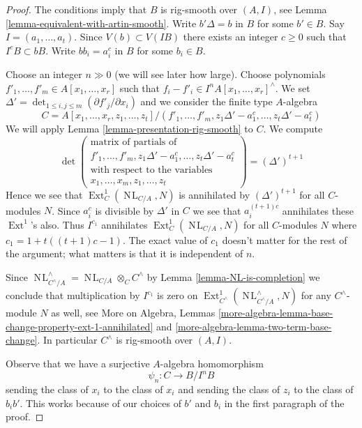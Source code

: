 \documentclass[10pt,a4paper]{amsart}
\theoremstyle{plain}
\theoremstyle{definition}
\theoremstyle{remark}
\numberwithin{equation}{subsection}
\def\Ext{\mathop{\mathrm{Ext}}\nolimits}
\def\NL{\mathop{N\!L}\nolimits}
\begin{document}
\begin{proof}
The conditions imply that $B$ is rig-smooth over $(A, I)$, see
Lemma \ref{lemma-equivalent-with-artin-smooth}.
Write $b' \Delta = b$ in $B$ for some $b' \in B$.
Say $I = (a_1, \ldots, a_t)$. Since $V(b) \subset V(IB)$ there
exists an integer $c \geq 0$ such that $I^cB \subset bB$.
Write $bb_i = a_i^c$ in $B$ for some $b_i \in B$.

\medskip\noindent
Choose an integer $n \gg 0$ (we will see later how large).
Choose polynomials $f'_1, \ldots, f'_m \in A[x_1, \ldots, x_r]$
such that $f_i - f'_i \in I^nA[x_1, \ldots, x_r]^\wedge$.
We set $\Delta' = \det_{1 \leq i, j \leq m}(\partial f'_j/\partial x_i)$
and we consider the finite type $A$-algebra
$$
C = A[x_1, \ldots, x_r, z_1, \ldots, z_t]/
(f'_1, \ldots, f'_m,
z_1\Delta' - a_1^c, \ldots, z_t\Delta' - a_t^c)
$$
We will apply Lemma \ref{lemma-presentation-rig-smooth} to $C$.
We compute
$$
\det\left(
\begin{matrix}
\text{matrix of partials of} \\
f'_1, \ldots, f'_m, z_1\Delta' - a_1^c, \ldots, z_t\Delta' - a_t^c \\
\text{with respect to the variables} \\
x_1, \ldots, x_m, z_1, \ldots, z_t
\end{matrix}
\right) =
(\Delta')^{t + 1}
$$
Hence we see that $\Ext^1_C(\NL_{C/A}, N)$ is annihilated by
$(\Delta')^{t + 1}$ for all $C$-modules $N$. Since $a_i^c$ is
divisible by $\Delta'$ in $C$ we see that $a_i^{(t + 1)c}$ annihilates
these $\Ext^1$'s also. Thus $I^{c_1}$ annihilates
$\Ext^1_C(\NL_{C/A}, N)$ for all $C$-modules $N$
where $c_1 = 1 + t((t + 1)c - 1)$. The exact value of $c_1$ doesn't matter for
the rest of the argument; what matters is that it is independent of $n$.

\medskip\noindent
Since $\NL_{C^\wedge/A}^\wedge = \NL_{C/A} \otimes_C C^\wedge$ by
Lemma \ref{lemma-NL-is-completion} we conclude that multiplication
by $I^{c_1}$ is zero on $\Ext^1_{C^\wedge}(\NL_{C^\wedge/A}^\wedge, N)$
for any $C^\wedge$-module $N$ as well, see
More on Algebra, Lemmas
\ref{more-algebra-lemma-base-change-property-ext-1-annihilated} and
\ref{more-algebra-lemma-two-term-base-change}.
In particular $C^\wedge$ is rig-smooth over $(A, I)$.

\medskip\noindent
Observe that we have a surjective $A$-algebra homomorphism
$$
\psi_n : C \longrightarrow B/I^nB
$$
sending the class of $x_i$ to the class of $x_i$ and sending the class of
$z_i$ to the class of $b_ib'$. This works because of our choices of $b'$
and $b_i$ in the first paragraph of the proof.


\end{proof}
\end{document}
